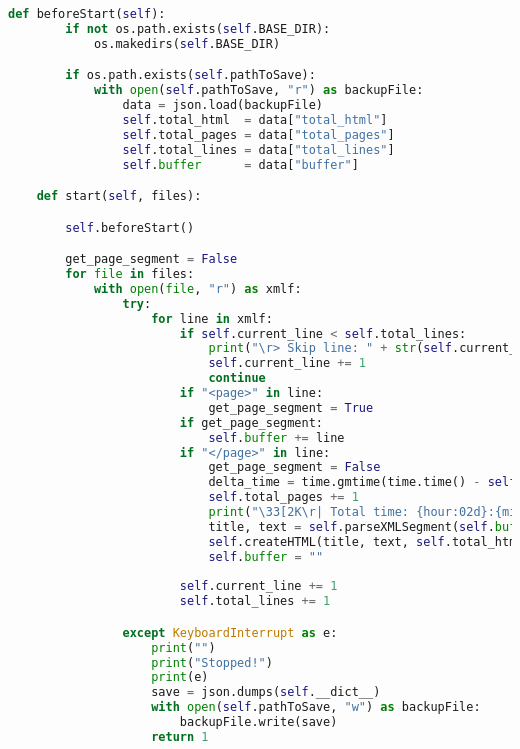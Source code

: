 \begin{lstlisting}[language=Python]
    def beforeStart(self):
        if not os.path.exists(self.BASE_DIR):
            os.makedirs(self.BASE_DIR)

        if os.path.exists(self.pathToSave):
            with open(self.pathToSave, "r") as backupFile:
                data = json.load(backupFile)
                self.total_html  = data["total_html"]
                self.total_pages = data["total_pages"]
                self.total_lines = data["total_lines"]
                self.buffer      = data["buffer"]

    def start(self, files):

        self.beforeStart()

        get_page_segment = False
        for file in files:
            with open(file, "r") as xmlf:
                try:
                    for line in xmlf:
                        if self.current_line < self.total_lines:
                            print("\r> Skip line: " + str(self.current_line), end="")
                            self.current_line += 1
                            continue
                        if "<page>" in line:
                            get_page_segment = True
                        if get_page_segment:
                            self.buffer += line
                        if "</page>" in line:
                            get_page_segment = False
                            delta_time = time.gmtime(time.time() - self.begin_time)
                            self.total_pages += 1
                            print("\33[2K\r| Total time: {hour:02d}:{min:02d}:{sec:02d} | Total pages: {total_p:10d} | Total HTML-docs: {total_h:10d} | Total lines: {total_l:15d} |".format(hour=delta_time.tm_hour, min=delta_time.tm_min, sec=delta_time.tm_sec, total_p=self.total_pages, total_h=self.total_html, total_l=self.total_lines), end="")
                            title, text = self.parseXMLSegment(self.buffer)
                            self.createHTML(title, text, self.total_html)
                            self.buffer = ""
                        
                        self.current_line += 1
                        self.total_lines += 1

                except KeyboardInterrupt as e:
                    print("")
                    print("Stopped!")
                    print(e)
                    save = json.dumps(self.__dict__)
                    with open(self.pathToSave, "w") as backupFile:
                        backupFile.write(save)
                    return 1


\end{lstlisting}
